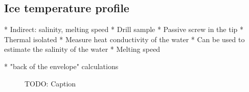 \subsection{Ice temperature profile}

* Indirect: salinity, melting speed
* Drill sample
* Passive screw in the tip
	* Thermal isolated
* Measure heat conductivity of the water
	* Can be used to estimate the salinity of the water
		* Melting speed

* "back of the envelope" calculations

\begin{figure}[htb]
	\centering
	\caption{TODO: Caption}
	\label{fig:T_vs_k}
\end{figure}

